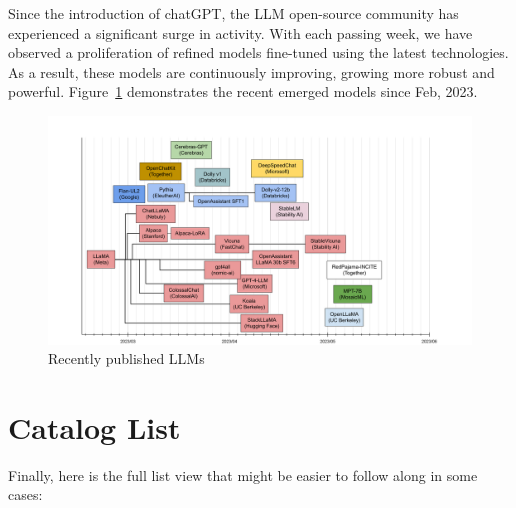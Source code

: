 \documentclass{article}
\begin{document}
Since the introduction of chatGPT, the LLM open-source community has experienced a significant surge in activity. With each passing week, we have observed a proliferation of refined models fine-tuned using the latest technologies. As a result, these models are continuously improving, growing more robust and powerful. Figure~\ref{fig:finetunedModels} demonstrates the recent emerged models since Feb, 2023.

\begin{figure}
    \centering
    \includegraphics[width=\textwidth,height=\textheight,keepaspectratio]{02-10.png}
    \caption{Recently published LLMs}
    \label{fig:finetunedModels}
\end{figure}


\appendix
\section{Catalog List}

Finally, here is the full list view that might be easier to follow along in some cases:
\end{document}
